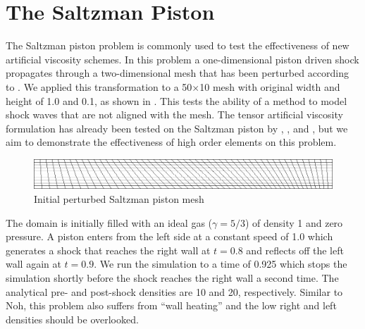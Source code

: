 
\section{The Saltzman Piston}
The Saltzman piston problem \cite{Saltzman1985,Gryra1992} is commonly used to test the effectiveness of new artificial viscosity schemes. In this problem a one-dimensional piston driven shock propagates through a two-dimensional mesh that has been perturbed according to . We applied this transformation to a 50$\times$10 mesh with original width and height of 1.0 and 0.1, as shown in . This tests the ability of a method to model shock waves that are not aligned with the mesh. The tensor artificial viscosity formulation has already been tested on the Saltzman piston by  \cite{CampbellShashkov01},  \cite{KolevRieben09}, and  \cite{Lipnikov2010}, but we aim to demonstrate the effectiveness of high order elements on this problem.


\begin{figure}[h!]
 \centering
 \includegraphics[width=6in,keepaspectratio=true]{./Figures/SaltzmanMesh2.png}
 \caption{Initial perturbed Saltzman piston mesh}
 \label{fig:SaltzmanMesh}
\end{figure}

The domain is initially filled with an ideal gas ($\gamma=5/3$) of density 1 and zero pressure. A piston enters from the left side at a constant speed of 1.0 which generates a shock that reaches the right wall at $t=0.8$ and reflects off the left wall again at $t=0.9$. We run the simulation to a time of 0.925 which stops the simulation shortly before the shock reaches the right wall a second time. The analytical pre- and post-shock densities are 10 and 20, respectively. Similar to Noh, this problem also suffers from ``wall heating'' and the low right and left densities should be overlooked. 

